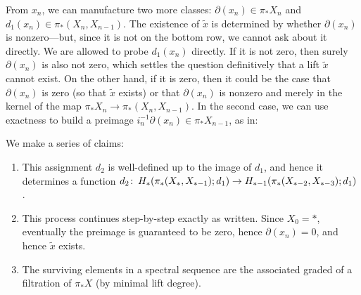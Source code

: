 From $x_n$, we can manufacture two more classes: $\partial(x_n) \in \pi_* X_n$ and $d_1(x_n) \in \pi_*(X_n, X_{n-1})$.
The existence of $\widetilde x$ is determined by whether $\partial(x_n)$ is nonzero---but, since it is not on the bottom row, we cannot ask about it directly.
We are allowed to probe $d_1(x_n)$ directly.
If it is not zero, then surely $\partial(x_n)$ is also not zero, which settles the question definitively that a lift $\widetilde{x}$ cannot exist.
On the other hand, if it is zero, then it could be the case that $\partial(x_n)$ is zero (so that $\widetilde{x}$ exists) or that $\partial(x_n)$ is nonzero and merely in the kernel of the map $\pi_* X_n \to \pi_*(X_n, X_{n-1})$.
In the second case, we can use exactness to build a preimage $i_n^{-1} \partial(x_n) \in \pi_* X_{n-1}$, as in:

\begin{figure*}[h]
\begin{center}
\end{center}
\end{figure*}

We make a series of claims:
\begin{enumerate}
    \item This assignment $d_2$ is well-defined up to the image of $d_1$, and hence it determines a function $d_2\colon\thinspace H_*(\pi_*(X_*, X_{*-1}); d_1) \to H_{*-1}(\pi_*(X_{*-2}, X_{*-3}); d_1)$.
    \item This process continues step-by-step exactly as written.  Since $X_0 = *$, eventually the preimage is guaranteed to be zero, hence $\partial(x_n) = 0$, and hence $\widetilde x$ exists.
    \item The surviving elements in a spectral sequence are the associated graded of a filtration of $\pi_* X$ (by minimal lift degree).
\end{enumerate}

